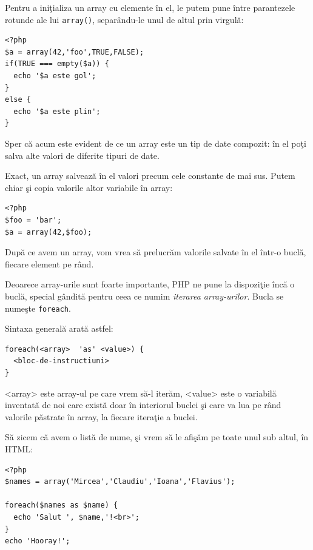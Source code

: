 Pentru a iniţializa un array cu elemente în el, le putem
pune între parantezele rotunde ale lui \texttt{array()},
separându-le unul de altul prin virgulă:
\begin{lstlisting}
<?php
$a = array(42,'foo',TRUE,FALSE);
if(TRUE === empty($a)) {
  echo '$a este gol';
}
else {
  echo '$a este plin';
}
\end{lstlisting}
Sper că acum este evident de ce un array este un tip de
date compozit: în el poţi salva alte valori de diferite tipuri
de date.

Exact, un array salvează în el valori precum cele constante
de mai sus. Putem chiar şi copia valorile altor variabile
în array:
\begin{lstlisting}
<?php
$foo = 'bar';
$a = array(42,$foo);
\end{lstlisting}

După ce avem un array, vom vrea să prelucrăm valorile
salvate în el într-o buclă, fiecare element pe rând.

Deoarece array-urile sunt foarte importante, PHP
ne pune la dispoziţie încă o buclă, special gândită
pentru ceea ce numim \textsl{iterarea array-urilor}.
Bucla se numeşte \texttt{foreach}.

Sintaxa generală arată astfel:
\begin{verbatim}
foreach(<array>  'as' <value>) {
  <bloc-de-instructiuni>
}
\end{verbatim}
<array> este array-ul pe care vrem să-l iterăm, <value>
este o variabilă inventată de noi care există
doar în interiorul buclei şi care va lua pe rând
valorile păstrate în array, la fiecare iteraţie a buclei.

Să zicem că avem o listă de nume, şi vrem să le afişăm pe toate
unul sub altul, în HTML:
\begin{lstlisting}
<?php
$names = array('Mircea','Claudiu','Ioana','Flavius');

foreach($names as $name) {
  echo 'Salut ', $name,'!<br>';
}
echo 'Hooray!';
\end{lstlisting}


